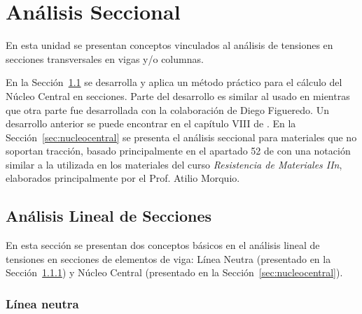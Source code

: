 %
%
%

\chapter{Análisis Seccional}

En esta unidad se presentan conceptos vinculados al análisis de tensiones en secciones transversales en vigas y/o columnas. %

En la Sección~\ref{sec:lnnc} se desarrolla y aplica un método práctico para el cálculo del Núcleo Central en secciones. %
%
Parte del desarrollo es similar al usado en \citep{Mofid2001} mientras que otra parte fue desarrollada con la colaboración de Diego Figueredo. %
%
Un desarrollo anterior se puede encontrar en el capítulo VIII de \citep{Timoshenko1953}. %
%
En la Sección~\ref{sec:nucleocentral} se presenta el análisis seccional para materiales que no soportan tracción, basado principalmente en el apartado 52 de \citep{Timoshenko1953} con una notación similar a la utilizada en los materiales del curso \textit{Resistencia de Materiales IIn}, elaborados principalmente por el Prof. Atilio Morquio.

\section{Análisis Lineal de Secciones} \label{sec:lnnc}

En esta sección se presentan dos conceptos básicos en el análisis lineal de tensiones en secciones de elementos de viga: Línea Neutra (presentado en la Sección~\ref{sec:lineaneutra}) y Núcleo Central (presentado en la Sección~\ref{sec:nucleocentral}).

\subsection{Línea neutra} \label{sec:lineaneutra}

